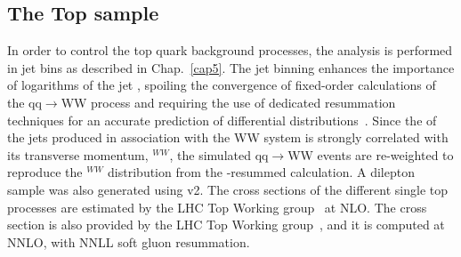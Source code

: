 \subsection*{The Top sample}
In order to control the top quark background processes, the analysis is
performed in jet bins as described in Chap.~\ref{cap5}. The jet binning enhances the importance of logarithms of the jet \pt, spoiling the convergence of 
fixed-order calculations of the qq$\rightarrow$WW process and requiring the use of dedicated resummation techniques for an
accurate prediction of differential distributions~\cite{Meade:2014fca,Jaiswal:2014yba}.  
Since the \pt of the jets produced in association with the WW system is strongly correlated with its transverse momentum, 
\pt$^{WW}$,  the simulated qq$\rightarrow$WW events are re-weighted  
to reproduce the \pt$^{WW}$ distribution from the \pt-resummed calculation.
A \ttbar  dilepton sample was also generated using \POWHEG v2. 
The cross sections of the different single top processes are estimated by the LHC Top Working group~\cite{singletop} at NLO.
The \ttbar cross section is also provided by the LHC Top Working group~\cite{topxsec}, and it is computed at NNLO, with NNLL soft gluon resummation. 


